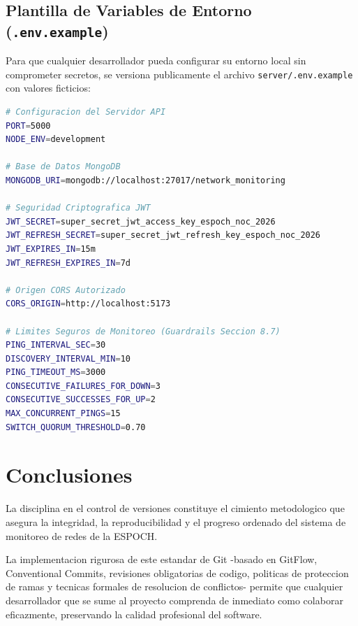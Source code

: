\documentclass[12pt,a4paper]{report}
\begin{document}
\section{Plantilla de Variables de Entorno (\texttt{.env.example})}
Para que cualquier desarrollador pueda configurar su entorno local sin comprometer secretos, se versiona publicamente el archivo \texttt{server/.env.example} con valores ficticios:

\begin{lstlisting}[language=bash]
# Configuracion del Servidor API
PORT=5000
NODE_ENV=development

# Base de Datos MongoDB
MONGODB_URI=mongodb://localhost:27017/network_monitoring

# Seguridad Criptografica JWT
JWT_SECRET=super_secret_jwt_access_key_espoch_noc_2026
JWT_REFRESH_SECRET=super_secret_jwt_refresh_key_espoch_noc_2026
JWT_EXPIRES_IN=15m
JWT_REFRESH_EXPIRES_IN=7d

# Origen CORS Autorizado
CORS_ORIGIN=http://localhost:5173

# Limites Seguros de Monitoreo (Guardrails Seccion 8.7)
PING_INTERVAL_SEC=30
DISCOVERY_INTERVAL_MIN=10
PING_TIMEOUT_MS=3000
CONSECUTIVE_FAILURES_FOR_DOWN=3
CONSECUTIVE_SUCCESSES_FOR_UP=2
MAX_CONCURRENT_PINGS=15
SWITCH_QUORUM_THRESHOLD=0.70
\end{lstlisting}

\chapter{Conclusiones}
La disciplina en el control de versiones constituye el cimiento metodologico que asegura la integridad, la reproducibilidad y el progreso ordenado del sistema de monitoreo de redes de la ESPOCH.

La implementacion rigurosa de este estandar de Git -basado en GitFlow, Conventional Commits, revisiones obligatorias de codigo, politicas de proteccion de ramas y tecnicas formales de resolucion de conflictos- permite que cualquier desarrollador que se sume al proyecto comprenda de inmediato como colaborar eficazmente, preservando la calidad profesional del software.
\end{document}
